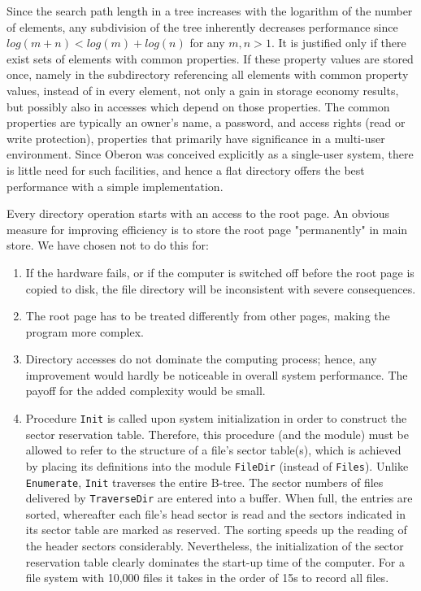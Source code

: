 Since the search path length in a tree increases with the logarithm of the number of elements,
any subdivision of the tree inherently decreases performance since $log(m + n) < log(m) + log (n)$
for any $m, n > 1$. It is justified only if there exist sets of elements with common properties. If
these property values are stored once, namely in the subdirectory referencing all elements with
common property values, instead of in every element, not only a gain in storage economy results,
but possibly also in accesses which depend on those properties. The common properties are typically
an owner's name, a password, and access rights (read or write protection), properties that primarily
have significance in a multi-user environment. Since Oberon was conceived explicitly as a single-user
system, there is little need for such facilities, and hence a flat directory offers the best
performance with a simple implementation.

Every directory operation starts with an access to the root page. An obvious measure for improving
efficiency is to store the root page "permanently" in main store. We have chosen not to do this for:
\begin{enumerate}
  \item If the hardware fails, or if the computer is switched off before the root page is copied to
    disk, the file directory will be inconsistent with severe consequences.
  \item The root page has to be treated differently from other pages, making the program more complex.
  \item Directory accesses do not dominate the computing process; hence, any improvement would hardly
    be noticeable in overall system performance. The payoff for the added complexity would be small.
  \item Procedure \verb|Init| is called upon system initialization in order to construct the sector
    reservation table. Therefore, this procedure (and the module) must be allowed to refer to the
    structure of a file's sector table(s), which is achieved by placing its definitions into the module
    \verb|FileDir| (instead of \verb|Files|). Unlike \verb|Enumerate|, \verb|Init| traverses the entire
    B-tree. The sector numbers of files delivered by \verb|TraverseDir| are entered into a buffer. When
    full, the entries are sorted, whereafter each file's head sector is read and the sectors indicated
    in its sector table are marked as reserved. The sorting speeds up the reading of the header sectors
    considerably. Nevertheless, the initialization of the sector reservation table clearly dominates
    the start-up time of the computer. For a file system with 10,000 files it takes in the order of 15s
    to record all files.
\end{enumerate}
